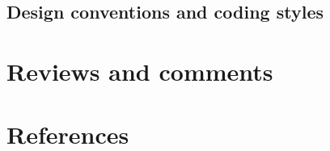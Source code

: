\documentclass[a4paper,11pt]{article}
\begin{document}
\subsection{Design conventions and coding styles}

\section{Reviews and comments}

\section{References}
\end{document}
